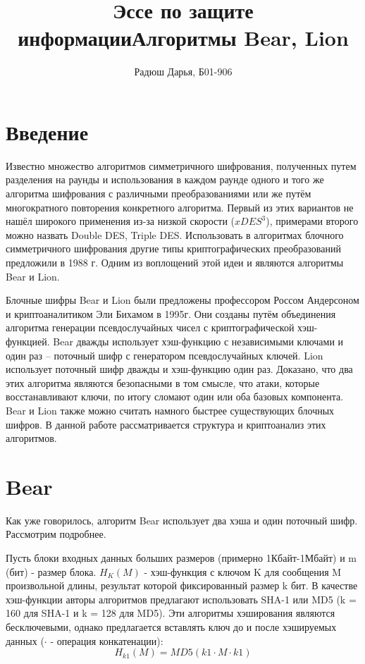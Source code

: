 \documentclass[12pt]{article}
\title{Эссе по защите информации}
\title{Алгоритмы Bear, Lion}
\author{Радюш Дарья, Б01-906}
\begin{document}
\maketitle



\section{Введение}

Известно множество алгоритмов симметричного шифрования, полученных путем разделения на раунды и использования в каждом раунде одного и того же алгоритма шифрования с различными преобразованиями или же путём многократного повторения конкретного алгоритма. Первый из этих вариантов не нашёл широкого применения из-за низкой скорости ($xDES^{3}$), примерами второго можно назвать Double DES, Triple DES. Использовать в алгоритмах блочного симметричного шифрования другие типы криптографических преобразований предложили в 1988 г. Одним из воплощений этой идеи и являются алгоритмы Bear и Lion.  

Блочные шифры Bear и Lion были предложены профессором Россом Андерсоном и криптоаналитиком Эли Бихамом в 1995г. Они созданы путём объединения алгоритма генерации псевдослучайных чисел с криптографической хэш-функцией. Bear дважды использует хэш-функцию с независимыми ключами и один раз -- поточный шифр с генератором псевдослучайных ключей. Lion использует поточный шифр дважды и хэш-функцию один раз. Доказано, что два этих алгоритма являются безопасными в том смысле, что атаки, которые восстанавливают ключи, по итогу сломают один или оба базовых компонента.  Bear и Lion также можно считать намного быстрее существующих блочных шифров. В данной работе рассматривается структура и криптоанализ этих алгоритмов.

\section{Bear}

Как уже говорилось, алгоритм Bear использует два хэша и один поточный шифр. Рассмотрим подробнее.

Пусть блоки входных данных больших размеров (примерно 1Кбайт-1Мбайт) и m (бит) - размер блока. ${H_{K}(M)}$ - хэш-функция с ключом K для сообщения M произвольной длины, результат которой фиксированный размер k бит. В качестве хэш-функции авторы алгоритмов предлагают использовать SHA-1 или MD5 (k = 160 для SHA-1 и k = 128 для MD5). Эти алгоритмы хэширования являются бесключевыми, однако предлагается вставлять ключ до и после хэшируемых данных (${\cdot}$ - операция конкатенации):
                 \[H_{k1}(M) = {MD5(k1\cdot M \cdot k1)}\]
                  
\end{document}
